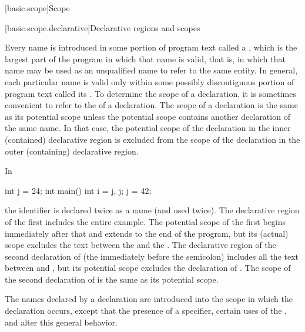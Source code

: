 [basic.scope]{Scope}%

[basic.scope.declarative]{Declarative regions and scopes}%

\pnum
{}%
Every name is introduced in some portion of program text called a
%
%
, which is the largest part of the program
in which that name is valid, that is, in which that name may
be used as an unqualified name to refer to the same entity. In general,
each particular name is valid only within some possibly discontiguous
portion of program text called its . To determine the
scope of a declaration, it is sometimes convenient to refer to the
 of a declaration. The scope of a declaration
is the same as its potential scope unless the potential scope contains
another declaration of the same name. In that case, the potential scope
of the declaration in the inner (contained) declarative region is
excluded from the scope of the declaration in the outer (containing)
declarative region.

\pnum
\begin{example}
In

\begin{codeblock}
int j = 24;
int main() {
  int i = j, j;
  j = 42;
}
\end{codeblock}

the identifier  is declared twice as a name (and used twice).
The declarative region of the first  includes the entire
example. The potential scope of the first  begins immediately
after that  and extends to the end of the program, but its
(actual) scope excludes the text between the \tcode{,} and the
\tcode{\}}. The declarative region of the second declaration of
 (the  immediately before the semicolon) includes all
the text between \tcode{\{} and \tcode{\}}, but its potential scope
excludes the declaration of . The scope of the second
declaration of  is the same as its potential scope.
\end{example}

\pnum
The names declared by a declaration are introduced into the scope in
which the declaration occurs, except that the presence of a
 specifier, certain uses of the
, and
 alter this general
behavior.


